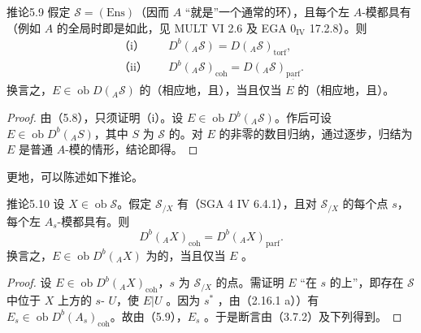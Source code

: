 \begin{SGAresult}{推论}{5.9}
假定 $\mathscr S=(\mathrm{Ens})$（因而 $A$ “就是”一个通常的环），且每个左 $A$-模都具有（例如 $A$ 的全局时即是如此，见 MULT VI 2.6 及 EGA $0_{\mathrm{IV}}$ 17.2.8）。则
\begin{align*}
\text{（i）}\quad&D^b({}_A\mathscr S)=D({}_A\mathscr S)_{\mathrm{torf}},\\
\text{（ii）}\quad&D^b({}_A\mathscr S)_{\mathrm{coh}}=D({}_A\mathscr S)_{\underline{\mathrm{parf}}}.
\end{align*}
换言之，$E\in\operatorname{ob}D({}_A\mathscr S)$ 的（相应地，且），当且仅当 $E$ 的（相应地，且）。
\end{SGAresult}
\begin{proof}
由（5.8），只须证明（i）。设 $E\in\operatorname{ob}D^b({}_A\mathscr S)$。作后可设 $E\in\operatorname{ob}D^b({}_AS)$，其中 $S$ 为 $\mathscr S$ 的。对 $E$ 的非零的数目归纳，通过逐步，归结为 $E$ 是普通 $A$-模的情形，结论即得。
\end{proof}
更地，可以陈述如下推论。

\begin{SGAresult}{推论}{5.10}
设 $X\in\operatorname{ob}\mathscr S$。假定 $\mathscr S_{/X}$ 有（SGA 4 IV 6.4.1），且对 $\mathscr S_{/X}$ 的每个点 $s$，每个左 $A_s$-模都具有。则
\[D^b({}_AX)_{\mathrm{coh}}=D^b({}_AX)_{\mathrm{parf}}.\]
换言之，$E\in\operatorname{ob}D^b({}_AX)$ 为的，当且仅当 $E$ 。
\end{SGAresult}
\begin{proof}
设 $E\in\operatorname{ob}D^b({}_AX)_{\mathrm{coh}}$，$s$ 为 $\mathscr S_{/X}$ 的点。需证明 $E$ “在 $s$ 的上”，即存在 $\mathscr S$ 中位于 $X$ 上方的 $s$- $U$，使 $E|U$ 。因为 $s^*$ ，由（2.16.1 a））有 $E_s\in\operatorname{ob}D^b(A_s)_{\mathrm{coh}}$。故由（5.9），$E_s$ 。于是断言由（3.7.2）及下列得到。
\end{proof}

